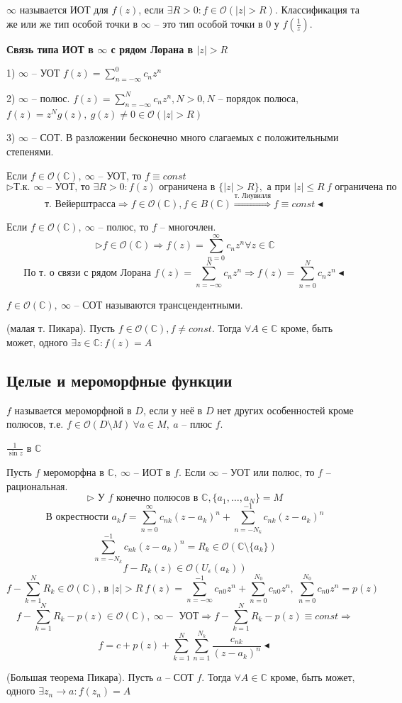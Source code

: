  $\infty$ называется ИОТ для $f(z)$, если $\exists R > 0: f \in \mathcal{O}(|z|> R)$. Классификация та же или же тип особой точки в $\infty$ -- это тип особой точки в 0 у $f\left(\frac{1}{z}\right)$.

\textbf{Связь типа ИОТ в $\infty$ с рядом Лорана в $|z| > R$}

1) $\infty$ -- УОТ $f(z) = \sum_{n=-\infty}^0 c_n z^n$

2) $\infty$ -- полюс. $f(z) = \sum_{n=-\infty}^N c_n z^n, N > 0, N$ -- порядок полюса, $f(z) = z^N g(z), \ g(z) \neq 0 \in \mathcal{O}(|z|>R)$

3) $\infty$ -- СОТ. В разложении бесконечно много слагаемых с положительными степенями.

 Если $f \in \mathcal{O}(\mathbb{C}), \ \infty$ -- УОТ, то $f \equiv const$
\[\triangleright \text{Т.к. $\infty$ -- УОТ, то } \exists R > 0: f(z) \text{ ограничена в } \{|z|>R\}, \text{ а при $|z| \leq R \ f$ ограничена по}\]
\[\text{т. Вейерштрасса} \Rightarrow f \in \mathcal{O}(\mathbb{C}), f \in B(\mathbb{C}) \overset{\text{т. Лиувилля}}{\Rightarrow} f \equiv const \blacktriangleleft\]

 Если $f \in \mathcal{O}(\mathbb{C}), \ \infty$ -- полюс, то $f$ -- многочлен.
\[\triangleright f \in \mathcal{O}(\mathbb{C}) \Rightarrow f(z) = \sum_{n=0}^\infty c_n z^n \forall z \in \mathbb{C}\]
\[\text{По т. о связи с рядом Лорана } f(z) = \sum_{n=-\infty}^N c_n z^n \Rightarrow f(z) = \sum_{n=0}^N c_n z^n \blacktriangleleft\]

 $f \in \mathcal{O}(\mathbb{C}), \ \infty$ -- СОТ называются трансцендентными.

 (малая т. Пикара). Пусть $f \in \mathcal{O}(\mathbb{C}), f \neq const$. Тогда $\forall A \in \mathbb{C}$ кроме, быть может, одного $\exists z \in \mathbb{C}: f(z) = A$
\subsection{Целые и мероморфные функции}
 $f$ называется мероморфной в $D$, если у неё в $D$ нет других особенностей кроме полюсов, т.е. $f \in \mathcal{O}(D \setminus M) \ \forall a \in M, \ a$ -- плюс $f$.

 $\frac{1}{\sin z}$ в $\mathbb{C}$

 Пусть $f$ мероморфна в $\mathbb{C}, \ \infty$ -- ИОТ в $f$. Если $\infty$ -- УОТ или полюс, то $f$ -- рациональная.
\[\triangleright \text{ У $f$ конечно полюсов в } \mathbb{C}, \{a_1, \ldots, a_N\} = M\]
\[\text{В окрестности }a_k f = \sum_{n=0}^\infty c_{nk}(z-a_k)^n + \sum_{n=-N_k}^{-1} c_{nk}(z-a_k)^n\]
\[\sum_{n=-N_k}^{-1} c_{nk}(z-a_k)^n = R_k \in \mathcal{O}(\mathbb{C} \setminus \{a_k\})\]
\[f - R_k(z) \in \mathcal{O}(U_\epsilon(a_k))\]
\[f-\sum_{k=1}^N R_k \in \mathcal{O}(\mathbb{C}) \text{, в } |z| > R \ f(z) = \sum_{n=-\infty}^{-1} c_{n0}z^n + \sum_{n=0}^{N_0} c_{n0}z^n, \ \sum_{n=0}^{N_0} c_{n0}z^n = p(z)\]
\[f - \sum_{k=1}^N R_k - p(z) \in \mathcal{O}(\mathbb{C}), \ \infty -\text{ УОТ} \Rightarrow f - \sum_{k=1}^N R_k - p(z) \equiv const \Rightarrow\]
\[f = c + p(z) + \sum_{k=1}^N \sum_{n=1}^{N_k} \frac{c_{nk}}{(z-a_k)^n} \blacktriangleleft\]

 (Большая теорема Пикара). Пусть $a$ -- СОТ $f$. Тогда $\forall A \in \mathbb{C}$ кроме, быть может, одного $\exists z_n \to a: f(z_n) = A$